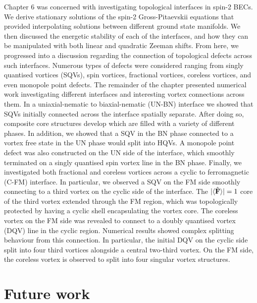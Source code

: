 Chapter 6 was concerned with investigating topological interfaces in spin-2
BECs.
We derive stationary solutions of the spin-2 Gross-Pitaevskii equations that
provided interpolating solutions between different ground state manifolds.
We then discussed the energetic stability of each of the interfaces, and how
they can be manipulated with both linear and quadratic Zeeman shifts.
From here, we progressed into a discussion regarding the connection of
topological defects across such interfaces.
Numerous types of defects were considered ranging from singly quantised
vortices (SQVs), spin vortices, fractional vortices, coreless vortices, and even
monopole point defects.
The remainder of the chapter presented numerical work investigating different
interfaces and interesting vortex connections across them.
In a uniaxial-nematic to biaxial-nematic (UN-BN) interface we showed that SQVs
initially connected across the interface spatially separate.
After doing so, composite core structures develop which are filled with a
variety of different phases.
In addition, we showed that a SQV in the BN phase connected to a vortex free
state in the UN phase would split into HQVs.
A monopole point defect was also constructed on the UN side of the interface,
which smoothly terminated on a singly quantised spin vortex line in the BN
phase.
Finally, we investigated both fractional and coreless vortices across a cyclic
to ferromagnetic (C-FM) interface.
In particular, we observed a SQV on the FM side smoothly connecting to a
third vortex on the cyclic side of the interface.
The \(|\langle \hat{\vb{F}} \rangle |=1\) core of the third vortex extended through the FM region,
which was topologically protected by having a cyclic shell encapsulating the
vortex core.
The coreless vortex on the FM side was revealed to connect to a doubly quantised
vortex (DQV) line in the cyclic region.
Numerical results showed complex splitting behaviour from this connection.
In particular, the initial DQV on the cyclic side split into four third
vortices alongside a central two-third vortex.
On the FM side, the coreless vortex is observed to split into four singular
vortex structures.

\section{Future work}

